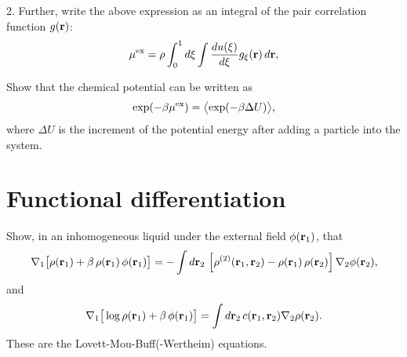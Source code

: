 \documentclass{book}
\begin{document}
2. Further, write the above expression as an integral of
the pair correlation function $g(\boldsymbol{\mathbf{r}})$:
\begin{equation}
  { { \mu }^{ \mathrm{ex} } }
=
  \rho \int_0^1 d\xi \int \frac{d u(\xi)}{d\xi} g_\xi(\boldsymbol{\mathbf{r}}) \, d\boldsymbol{\mathbf{r}},
  \label{eq:mutigr}
\end{equation}




Show that the chemical potential can be written as
\begin{equation}
  \exp(-\beta { { \mu }^{ \mathrm{ex} } })
=
  \bigl\langle
    \exp( -\beta \Delta U )
  \bigr\rangle,
\end{equation}
%
where $\Delta U$ is the increment of the potential energy
after adding a particle into the system.



\chapter{Functional differentiation}


%
%






Show, in an inhomogeneous liquid under the external field $\phi(\boldsymbol{\mathbf{r}}_1)$, that
%
\begin{align*}
  \nabla_1 \big[
    \rho(\boldsymbol{\mathbf{r}}_1)
  + \beta \, \rho(\boldsymbol{\mathbf{r}}_1) \, \phi(\boldsymbol{\mathbf{r}}_1)
\big]
  =
  -\int d \boldsymbol{\mathbf{r}}_2 \,
    \left[
      \rho^{(2)}(\boldsymbol{\mathbf{r}}_1, \boldsymbol{\mathbf{r}}_2) - \rho(\boldsymbol{\mathbf{r}}_1) \, \rho(\boldsymbol{\mathbf{r}}_2)
    \right]
    \nabla_2 \phi(\boldsymbol{\mathbf{r}}_2),
\end{align*}
%
and
%
\begin{align}
  \nabla_1 \big[
    \log \rho(\boldsymbol{\mathbf{r}}_1) + \beta \, \phi(\boldsymbol{\mathbf{r}}_1)
  \big]
   = \int d \boldsymbol{\mathbf{r}}_2 \,
    c(\boldsymbol{\mathbf{r}}_1, \boldsymbol{\mathbf{r}}_2)
    \nabla_2 \rho(\boldsymbol{\mathbf{r}}_2).
\end{align}
These are the Lovett-Mou-Buff(-Wertheim) equations\cite{lovett1976, wertheim1976}.
\end{document}
